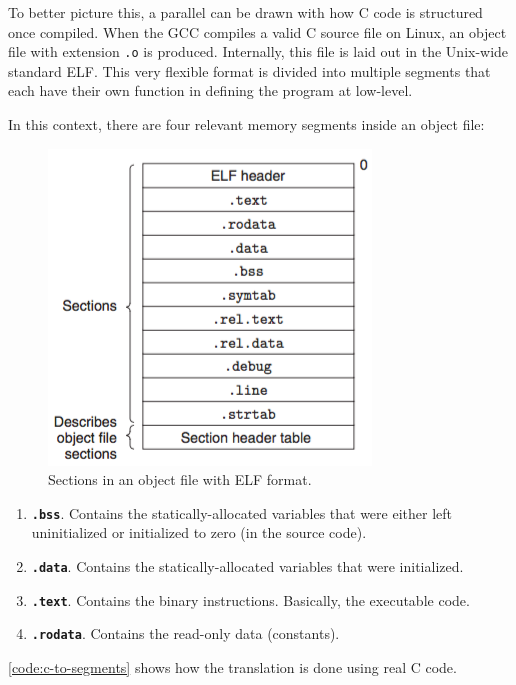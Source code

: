 {To better picture this, a parallel can be drawn with how C code is structured once compiled. When the \gls{GCC} compiles a valid C source file on Linux, an object file with extension \texttt{.o} is produced. Internally, this file is laid out in the Unix-wide standard \gls{ELF}. This very flexible format is divided into multiple segments that each have their own function in defining the program at low-level.

In this context, there are four relevant memory segments inside an object file:
\begin{figure}
	\centering 
	\includegraphics[width=.9\linewidth,keepaspectratio]{art/reloc-obj.png}
	\caption{Sections in an object file with ELF format.\cite{online:zhang}}
	\label{fig:sections-obj}
	\vspace{-24pt}
\end{figure}
\begin{enumerate}
	\item \textbf{\texttt{.bss}}. Contains the statically-allocated variables that were either left uninitialized or initialized to zero (in the source code).
	\item \textbf{\texttt{.data}}. Contains the statically-allocated variables that were initialized.
	\item \textbf{\texttt{.text}}. Contains the binary instructions. Basically, the executable code.
	\item \textbf{\texttt{.rodata}}. Contains the read-only data (constants).
\end{enumerate}
\autoref{code:c-to-segments} shows how the translation is done using real C code.

}
